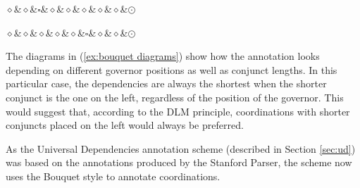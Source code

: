 \begin{multicols}{2}
\begin{exe}
\begin{xlist}
\ex
\begin{dependency}[theme = simple]
    \begin{deptext}
        $\diamond$\&$\diamond$\&$\square$\&$\diamond$\&$\diamond$\&$\diamond$\&$\diamond$\&$\diamond$\&$\odot$\\
    \end{deptext}
\end{dependency}

\ex
\begin{dependency}[theme = simple]
    \begin{deptext}
        $\diamond$\&$\diamond$\&$\diamond$\&$\diamond$\&$\diamond$\&$\square$\&$\diamond$\&$\diamond$\&$\odot$\\
    \end{deptext}
\end{dependency}
\end{xlist}
\end{exe}
\end{multicols}
The diagrams in (\ref{ex:bouquet diagrams}) show how the annotation looks depending on different governor positions as well as conjunct lengths. In this particular case, the dependencies are always the shortest when the shorter conjunct is the one on the left, regardless of the position of the governor. This would suggest that, according to the DLM principle, coordinations with shorter conjuncts placed on the left would always be preferred. 

As the Universal Dependencies annotation scheme (described in Section \ref{sec:ud}) was based on the annotations produced by the Stanford Parser, the scheme now uses the Bouquet style to annotate coordinations. 